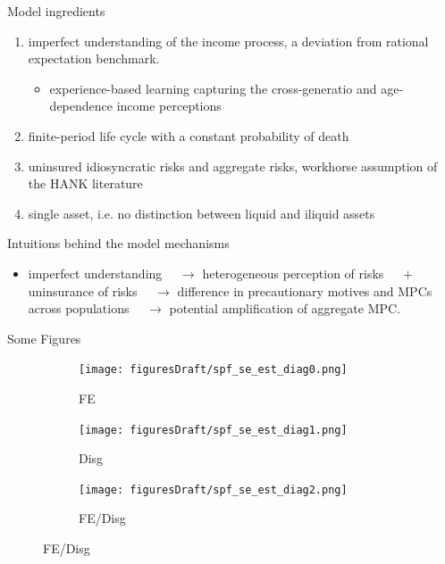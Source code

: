 \documentclass{beamer}
\begin{document}
\begin{frame}{Model ingredients}
	
	\begin{enumerate}
		\item imperfect understanding of the income process, a deviation from rational expectation benchmark. 
		\begin{itemize}
			\item experience-based learning capturing the cross-generatio and age-dependence income perceptions
		\end{itemize}
		\item finite-period life cycle with a constant probability of death 
		\item uninsured idiosyncratic risks and aggregate risks, workhorse assumption of the HANK literature
		\item single asset, i.e. no distinction between liquid and iliquid assets 
	\end{enumerate}
\end{frame}

\begin{frame}{Intuitions behind the model mechanisms}
	\begin{itemize}
		\item imperfect understanding $ \quad \rightarrow$ heterogeneous perception of risks $ \quad \plus$ uninsurance of risks $ \quad \rightarrow$ difference in precautionary motives and MPCs across populations $ \quad \rightarrow$ potential amplification of aggregate MPC. 
	\end{itemize}
\end{frame}



\begin{frame}{Some Figures}
	\begin{figure}[ht]
		\label{figurelabel}
		\begin{subfigure}[b]{0.2\textwidth}
			\centering
			\caption{FE}
			\texttt{[image: figuresDraft/spf\_se\_est\_diag0.png]}
		\end{subfigure}
		\hfill
		\begin{subfigure}[b]{0.2\textwidth}
			\caption{Disg}
			\texttt{[image: figuresDraft/spf\_se\_est\_diag1.png]}
		\end{subfigure}
		\hfill
		\begin{subfigure}[b]{0.2\textwidth}
			\caption{FE/Disg}
			\texttt{[image: figuresDraft/spf\_se\_est\_diag2.png]}
		\end{subfigure}
	\end{figure}
\end{frame}
\end{document}
